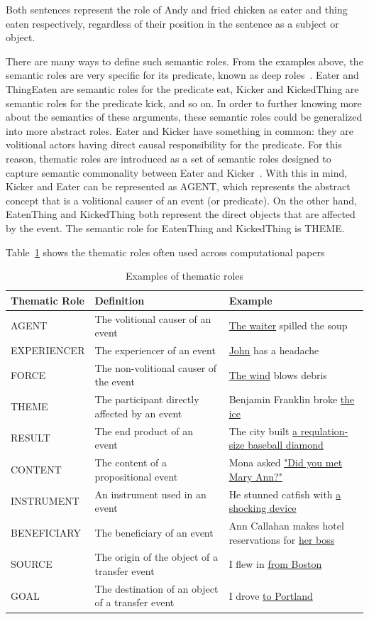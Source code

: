 Both sentences represent the role of Andy and fried chicken as eater and thing eaten respectively, regardless of their position in the sentence as a subject or object.

There are many ways to define such semantic roles. From the examples above, the semantic roles are very specific for its predicate, known as deep roles~\citep{jurafsky2000speech}. Eater and ThingEaten are semantic roles for the predicate eat, Kicker and KickedThing are semantic roles for the predicate kick, and so on. In order to further knowing more about the semantics of these arguments, these semantic roles could be generalized into more abstract roles. Eater and Kicker have something in common: they are volitional actors having direct causal responsibility for the predicate. For this reason, thematic roles are introduced as a set of semantic roles designed to capture semantic commonality between Eater and Kicker~\citep{jurafsky2000speech}. With this in mind, Kicker and Eater can be represented as AGENT, which represents the abstract concept that is a volitional causer of an event (or predicate). On the other hand, EatenThing and KickedThing both represent the direct objects that are affected by the event. The semantic role for EatenThing and KickedThing is THEME.

Table~\ref{tab:examplesrl3} shows the thematic roles often used across computational papers~\citep{jurafsky2000speech}
\begin{table}
	\scriptsize
	\centering
	\caption{Examples of thematic roles}
	\label{tab:examplesrl3}
	\begin{tabular}{lll}
		\hline
		\textbf{Thematic Role} & \textbf{Definition} & \textbf{Example} \\
		\hline
		AGENT & The volitional causer of an event & \underline{The waiter} spilled the soup \\
		EXPERIENCER & The experiencer of an event & \underline{John} has a headache \\
		FORCE & The non-volitional causer of the event & \underline{The wind} blows debris \\
		THEME & The participant directly affected by an event & Benjamin Franklin broke \underline{the ice} \\
		RESULT & The end product of an event & The city built \underline{a requlation-size baseball diamond} \\
		CONTENT & The content of a propositional event & Mona asked \underline{"Did you met Mary Ann?"} \\
		INSTRUMENT & An instrument used in an event & He stunned catfish with \underline{a shocking device} \\
		BENEFICIARY & The beneficiary of an event & Ann Callahan makes hotel reservations for \underline{her boss} \\
		SOURCE & The origin of the object of a transfer event & I flew in \underline{from Boston} \\
		GOAL & The destination of an object of a transfer event & I drove \underline{to Portland} \\
		\hline
	\end{tabular}

\end{table}


